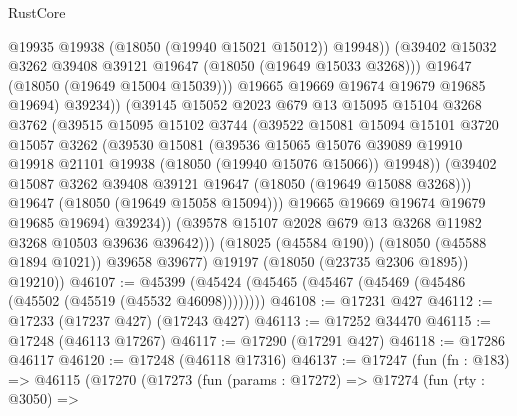 \begin{lexlean}{RustCore}
\begin{coremodule}
                            @19935
                            @19938
                            (@18050 (@19940 @15021 @15012))
                            @19948))
                        (@39402 @15032 @3262 @39408 @39121 @19647 (@18050 (@19649 @15033 @3268)))
                        @19647
                        (@18050 (@19649 @15004 @15039)))
                      @19665
                      @19669
                      @19674
                      @19679
                      @19685
                      @19694)
                    @39234))
                (@39145
                  @15052
                  @2023
                  @679
                  @13
                  @15095
                  @15104
                  @3268
                  @3762
                  (@39515
                    @15095
                    @15102
                    @3744
                    (@39522
                      @15081
                      @15094
                      @15101
                      @3720
                      @15057
                      @3262
                      (@39530
                        @15081
                        (@39536
                          @15065
                          @15076
                          @39089
                          @19910
                          @19918
                          @21101
                          @19938
                          (@18050 (@19940 @15076 @15066))
                          @19948))
                      (@39402 @15087 @3262 @39408 @39121 @19647 (@18050 (@19649 @15088 @3268)))
                      @19647
                      (@18050 (@19649 @15058 @15094)))
                    @19665
                    @19669
                    @19674
                    @19679
                    @19685
                    @19694)
                  @39234))
              (@39578 @15107 @2028 @679 @13 @3268 @11982 @3268 @10503 @39636 @39642)))
          (@18025 (@45584 @190))
          (@18050 (@45588 @1894 @1021))
          @39658
          @39677)
        @19197
        (@18050 (@23735 @2306 @1895))
        @19210))
@46107 := @45399 (@45424 (@45465 (@45467 (@45469 (@45486 (@45502 (@45519 (@45532 @46098))))))))
@46108 := @17231 @427
@46112 := @17233 (@17237 @427) (@17243 @427)
@46113 := @17252 @34470
@46115 := @17248 (@46113 @17267)
@46117 := @17290 (@17291 @427)
@46118 := @17286 @46117
@46120 := @17248 (@46118 @17316)
@46137 := @17247
    (fun (fn : @183) =>
    @46115
      (@17270
        (@17273
          (fun (params : @17272) =>
          @17274
            (fun (rty : @3050) =>

\end{coremodule}
\end{lexlean}
